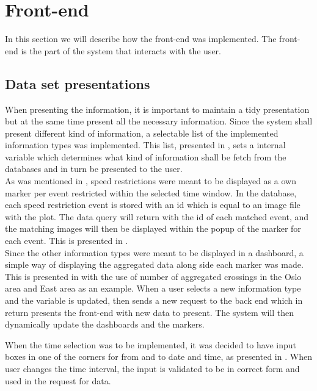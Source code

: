 \clearpage
\section{Front-end} %
\label{sec:front_end}
In this section we will describe how the front-end was implemented. The
front-end is the part of the system that interacts with the user.

\subsection{Data set presentations} %
\label{sub:front_end_data_set_presentation}
When presenting the information, it is important to maintain a tidy
presentation but at the same time present all the necessary information. Since
the system shall present different kind of information, a selectable list of
the implemented information types was implemented. This list, presented in
, sets a 
internal variable which determines what kind of information shall be fetch 
from the databases and in turn be presented to the user.\\

As was mentioned in , speed restrictions were
meant to be displayed as a own marker per event restricted within the selected
time window. In the database, each speed restriction event is stored with an id
which is equal to an image file with the plot. The data query will return with 
the id of each matched event, and the matching images will then be displayed
within the popup of the marker for each event. This is presented in
.\\


Since the other information types were meant to be displayed in a dashboard, a
simple way of displaying the aggregated data along side each marker was made.
This is presented in  with the use of number
of aggregated crossings in the Oslo area and East area as an example.
When a user selects a new information type and the variable is updated, then
sends a new request to the back end which in return presents the front-end with
new data to present. The system will then dynamically update the dashboards and
the markers.

When the time selection was to be implemented, it was decided to have input
boxes in one of the corners for from and to date and time, as presented in
. When user changes the time interval, the
input is validated to be in correct form and used in the request for data.\\

